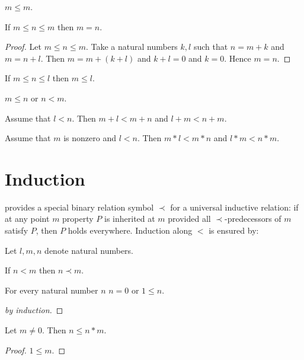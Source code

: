 \documentclass[11pt]{article}
\begin{document}
\begin{forthel}

\begin{lemma}
$m \leq m$.
\end{lemma}

\begin{lemma}
If $m \leq n \leq m$ then $m = n$.
\end{lemma}
\begin{proof}
Let $m \leq n \leq m$.
Take a natural numbers $k,l$ such that
$n = m + k$ and $m = n + l$.
Then $m = m + (k + l)$ and $k + l = 0$ and $k = 0$.
Hence $m = n$.
\end{proof}

\begin{lemma}
If $m \leq n \leq l$ then  $m \leq l$.
\end{lemma}

\begin{axiom}
$m \leq n$ or $n < m$.
\end{axiom}

\begin{lemma}
Assume that $l < n$.
Then $m + l < m + n$ and $l + m < n + m$.
\end{lemma}

\begin{lemma}
Assume that $m$ is nonzero and $l < n$.
Then $m * l < m * n$ and $l * m < n * m$.
\end{lemma}

\end{forthel}


\section{Induction}

\Naproche provides a special binary relation
symbol $\prec$ for a universal inductive relation: if at any
point $m$ property $P$ is inherited at $m$ provided all
$\prec$-predecessors of $m$ satisfy $P$, then $P$ holds everywhere.
Induction along $<$ is ensured by:

\begin{forthel}
Let $l,m,n$ denote natural numbers.

\begin{axiom}
If $n < m$ then $n \prec m$.
\end{axiom}

\begin{lemma}
For every natural number $n$ $n = 0$ or $1 \leq n$.
\end{lemma}
\begin{proof}[by induction]
\end{proof}

\begin{lemma}
Let $m \neq 0$. Then $n \leq n * m$.
\end{lemma}
\begin{proof}
$1 \leq m$.
\end{proof}

\end{forthel}
\end{document}
